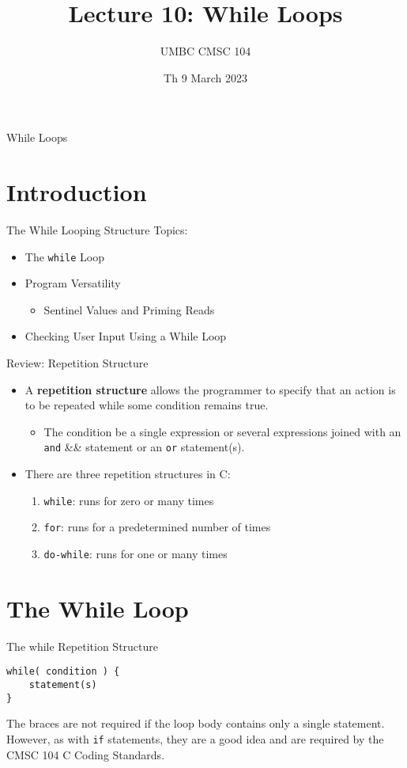 \documentclass[graphics]{beamer}
\title{Lecture 10: While Loops}
\author{UMBC CMSC 104}
\date{Th 9 March 2023}
\begin{document}
\begin{frame}{}
\centering
    While Loops
\end{frame}

\section*{Introduction}
\begin{frame}{The While Looping Structure}
    Topics:
    \begin{itemize}
        \item The \texttt{while} Loop
        \item Program Versatility
        \begin{itemize}
            \item Sentinel Values and Priming Reads
        \end{itemize}
        \item Checking User Input Using a While Loop
    \end{itemize}
\end{frame}

\begin{frame}{Review: Repetition Structure}
    \begin{itemize}
        \item A \textbf{repetition structure} allows the programmer to specify that an action is to be repeated while some condition remains true.
        \begin{itemize}
            \item The condition be a single expression or several expressions joined with an \texttt{and} \&\& statement or an \texttt{or} \textbar\textbar statement(s). 
        \end{itemize}
        \item There are three repetition structures in C:
        \begin{enumerate}
            \item \texttt{while}: runs for zero or many times
            \item \texttt{for}: runs for a predetermined number of times
            \item \texttt{do-while}: runs for one or many times
        \end{enumerate}
    \end{itemize}
\end{frame}

\section*{The While Loop}
\begin{frame}[fragile]{The while Repetition Structure}
\begin{verbatim}
while( condition ) {
    statement(s)
}
\end{verbatim}
The braces are not required if the loop body contains only a single statement. However, as with \texttt{if} statements, they are a good idea and are required by the CMSC 104 C Coding Standards.
\end{frame}
\end{document}
